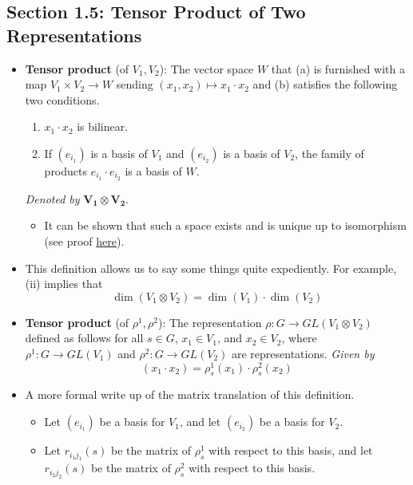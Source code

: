 \documentclass[../notes.tex]{subfiles}
\begin{document}
\subsection*{Section 1.5: Tensor Product of Two Representations}
\begin{itemize}
    \item {}\textbf{Tensor product} (of $V_1,V_2$): The vector space $W$ that (a) is furnished with a map $V_1\times V_2\to W$ sending $(x_1,x_2)\mapsto x_1\cdot x_2$ and (b) satisfies the following two conditions.
    \begin{enumerate}[label={(\roman*)}]
        \item $x_1\cdot x_2$ is bilinear.
        \item If $(e_{i_1})$ is a basis of $V_1$ and $(e_{i_2})$ is a basis of $V_2$, the family of products $e_{i_1}\cdot e_{i_2}$ is a basis of $W$.
    \end{enumerate}
    \emph{Denoted by} $\bm{V_1\otimes V_2}$.
    \begin{itemize}
        \item It can be shown that such a space exists and is unique up to isomorphism (see proof \href{https://www-users.cse.umn.edu/~garrett/m/algebra/notes/27.pdf}{here}).
    \end{itemize}
    \item This definition allows us to say some things quite expediently. For example, (ii) implies that
    \begin{equation*}
        \dim(V_1\otimes V_2) = \dim(V_1)\cdot\dim(V_2)
    \end{equation*}
    \item \textbf{Tensor product} (of $\rho^1,\rho^2$): The representation $\rho:G\to GL(V_1\otimes V_2)$ defined as follows for all $s\in G$, $x_1\in V_1$, and $x_2\in V_2$, where $\rho^1:G\to GL(V_1)$ and $\rho^2:G\to GL(V_2)$ are representations. \emph{Given by}
    \begin{equation*}
        [\rho_s^1\otimes\rho_s^2](x_1\cdot x_2) = \rho_s^1(x_1)\cdot\rho_s^2(x_2)
    \end{equation*}
    \item A more formal write up of the matrix translation of this definition.
    \begin{itemize}
        \item Let $(e_{i_1})$ be a basis for $V_1$, and let $(e_{i_2})$ be a basis for $V_2$.
        \item Let $r_{i_1j_1}(s)$ be the matrix of $\rho_s^1$ with respect to this basis, and let $r_{i_2j_2}(s)$ be the matrix of $\rho_s^2$ with respect to this basis.

\end{itemize}
\end{itemize}
\end{document}
